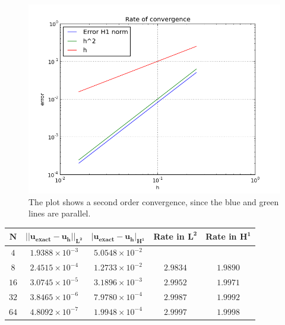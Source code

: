 \documentclass[a4paper,11pt,openright,twoside]{book}
\begin{document}
\vspace{1cm}
\begin{figure}[h!]
\centering
\includegraphics[width=\textwidth]{images/convergence_sine}
\caption{The plot shows a second order convergence, since the blue and green lines are parallel.}
\end{figure}
\vspace{1cm}

\begin{center}
\begin{tabular}{| c | c | c | c | c |}
\hline
$  \mathbf{N}$ & $ \mathbf{|| u_{exact} - u_h ||_{L^2}}$ & $  \mathbf{ | u_{exact} - u_h |_{H^1}}$ & \textbf{Rate in }  $ \mathbf{L^2}$ & \textbf{Rate in } $  \mathbf{H^1}$  \\
\hline
$ 4 $ & $1.9388 \times 10^{-3}$ & $5.0548 \times 10^{-2}$  & & \\
\hline
$ 8$ & $2.4515  \times 10^{-4}$ & $1.2733 \times 10^{-2}$ &  $2.9834$ &  $1.9890$   \\
\hline
$ 16 $ & $ 3.0745 \times 10^{-5}$ & $3.1896 \times 10^{-3}$ & $ 2.9952 $ & $1.9971$   \\
\hline
$ 32$ & $3.8465 \times 10^{-6}$ & $7.9780 \times 10^{-4}$ & $ 2.9987 $ & $ 1.9992 $  \\
\hline
$ 64$ & $4.8092 \times 10^{-7}$ & $1.9948 \times 10^{-4}$  & $ 2.9997 $ & $1.9998$ \\
\hline
\end{tabular}
\end{center}
\end{document}
